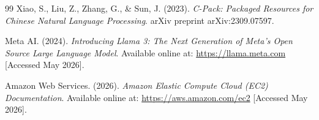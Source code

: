\documentclass[12pt,a4paper]{report}
\begin{document}
\begin{thebibliography}{99}
Xiao, S., Liu, Z., Zhang, G., \& Sun, J. (2023). \textit{C-Pack: Packaged Resources for Chinese Natural Language Processing}. arXiv preprint arXiv:2309.07597.

Meta AI. (2024). \textit{Introducing Llama 3: The Next Generation of Meta's Open Source Large Language Model}. Available online at: \url{https://llama.meta.com} [Accessed May 2026].

Amazon Web Services. (2026). \textit{Amazon Elastic Compute Cloud (EC2) Documentation}. Available online at: \url{https://aws.amazon.com/ec2} [Accessed May 2026].

\end{thebibliography}
\end{document}
